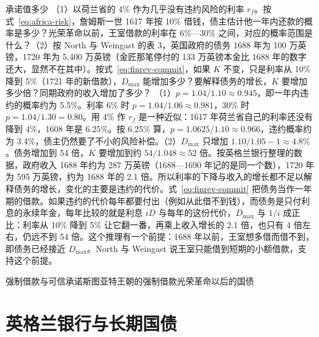 \begin{example}{承诺值多少}\label{ex:finrev-commit}
（1）以荷兰省的 4\% 作为几乎没有违约风险的利率 $r_f$。按式~\eqref{eq:africa-risk}，詹姆斯一世 1617 年按 10\% 借钱，债主估计他一年内还款的概率是多少？光荣革命以前，王室借款的利率在 6\%—30\% 之间，对应的概率范围是什么？（2）按 North 与 Weingast 的表 3，英国政府的债务 1688 年为 100 万英镑，1720 年为 5,400 万英镑（金匠那笔停付的 133 万英镑本金比 1688 年的数字还大，显然不在其中）。按式~\eqref{eq:finrev-commit}，如果 $K$ 不变，只是利率从 10\% 降到 5\%（1721 年的新借款\cite{nw1989}），$D_{\max}$ 能增加多少？要解释债务的增长，$K$ 要增加多少倍？同期政府的收入增加了多少？
\solution （1）$p=1.04/1.10\approx0.945$，即一年内违约的概率约为 5.5\%。利率 6\% 时 $p=1.04/1.06\approx0.981$，30\% 时 $p=1.04/1.30=0.80$。用 4\% 作 $r_f$ 是一种近似：1617 年荷兰省自己的利率还没有降到 4\%，1608 年是 6.25\%。按 6.25\% 算，$p=1.0625/1.10\approx0.966$，违约概率约为 3.4\%，债主仍然要了不小的风险补偿。（2）$D_{\max}$ 只增加 $1.10/1.05-1\approx4.8\%$。债务增加到 54 倍，$K$ 要增加到约 $54/1.048\approx52$ 倍。按英格兰银行整理的数据，政府收入 1688 年约为 287 万英镑（1688—1690 年记的是同一个数），1720 年为 595 万英镑\cite{boe2017,mitchell1988}，约为 1688 年的 2.1 倍。所以利率的下降与收入的增长都不足以解释债务的增长，变化的主要是违约的代价。式~\eqref{eq:finrev-commit} 把债务当作一年期的借款。如果违约的代价每年都要付出（例如从此借不到钱），而债务是只付利息的永续年金，每年比较的就是利息 $iD$ 与每年的这份代价，$D_{\max}$ 与 $1/i$ 成正比：利率从 10\% 降到 5\% 让它翻一番，再乘上收入增长的 2.1 倍，也只有 4 倍左右，仍远不到 54 倍。这个推理有一个前提：1688 年以前，王室想多借而借不到，即债务已经接近 $D_{\max}$。North 与 Weingast 说王室只能借到短期的小额借款，支持这个前提。
\end{example}

\begin{compare}{强制借款与可信承诺}{斯图亚特王朝的强制借款}{光荣革命以后的国债}
\end{compare}

\section{英格兰银行与长期国债}\label{sec:finrev-bank}

